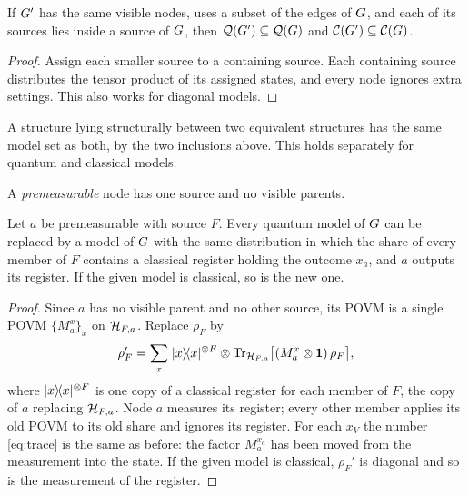 \begin{lemma}\label{lem:monotone}
If $G'$ has the same visible nodes, uses a subset of the edges of $G$, and each of its sources lies
inside a source of $G$, then $\mathcal{Q}(G')\subseteq\mathcal{Q}(G)$ and $\mathcal{C}(G')\subseteq\mathcal{C}(G)$.
\end{lemma}
\begin{proof}
Assign each smaller source to a containing source. Each containing source distributes the tensor product
of its assigned states, and every node ignores extra settings. This also works for diagonal models.
\end{proof}
\begin{corollary}[Sandwich]\label{cor:sandwich}
A structure lying structurally between two equivalent structures has the same model set as both,
by the two inclusions above. This holds separately for quantum and classical models.
\end{corollary}

\begin{definition}\label{def:prem}
A \emph{premeasurable} node has one source and no visible parents.
\end{definition}

\begin{lemma}\label{lem:premeasure}
Let $a$ be premeasurable with source $F$. Every quantum model of $G$ can be replaced by a model of $G$ with the
same distribution in which the share of every member of $F$ contains a classical register holding the outcome
$x_a$, and $a$ outputs its register. If the given model is classical, so is the new one.
\end{lemma}
\begin{proof}
Since $a$ has no visible parent and no other source, its POVM is a single POVM $\{M_a^{x}\}_x$ on $\mathcal{H}_{F,a}$.
Replace $\rho_F$ by
\[
\rho_F'=\sum_{x}\;\lvert x\rangle\!\langle x\rvert^{\otimes F}\otimes\operatorname{Tr}_{\mathcal{H}_{F,a}}\bigl[(M_a^{x}\otimes\mathbf{1})\,\rho_F\bigr],
\]
where $\lvert x\rangle\!\langle x\rvert^{\otimes F}$ is one copy of a classical register for each member of $F$, the copy of $a$ replacing
$\mathcal{H}_{F,a}$. Node $a$ measures its register; every other member applies its old POVM to its old share and ignores
its register. For each $x_V$ the number \eqref{eq:trace} is the same as before: the factor $M_a^{x_a}$ has been
moved from the measurement into the state. If the given model is classical, $\rho_F'$ is diagonal and so is the
measurement of the register.
\end{proof}

